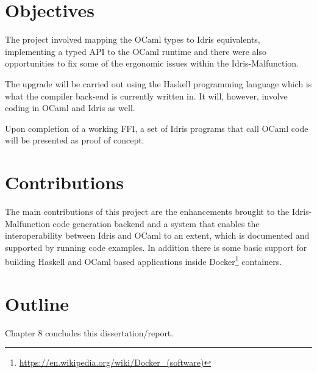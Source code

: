 \section{Objectives}
The project involved mapping the OCaml types to Idris equivalents,
implementing a typed API to the OCaml runtime and there were also
opportunities to fix some of the ergonomic issues within the
Idris-Malfunction.

The upgrade will be carried out using the Haskell programming language which is
what the compiler back-end is currently written in.
It will, however, involve coding in OCaml and Idris as well.

Upon completion of a working FFI, a set of Idris programs that
call OCaml code will be presented as proof of concept.


\section{Contributions}
The main contributions of this project are the enhancements brought
to the Idris-Malfunction code generation backend and a
system that enables the interoperability between Idris and OCaml
to an extent, which is documented and supported by running code
examples. In addition there is some basic support for building
Haskell and OCaml based applications inside
Docker\footnote{\url{https://en.wikipedia.org/wiki/Docker_(software)}}
containers.


\section{Outline}
Chapter 8 concludes this dissertation/report.